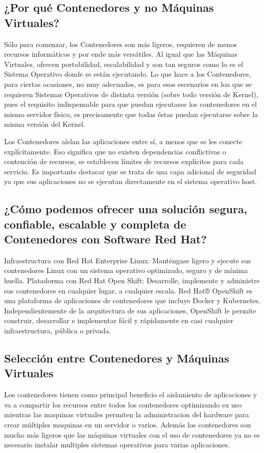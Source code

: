 \documentclass[preprint,12pt]{elsarticle}
\begin{document}
\subsection{\textbf{¿Por qué Contenedores y no Máquinas Virtuales?}}
Sólo para comenzar, los Contenedores son más ligeros, requieren de menos recursos informáticos y por ende más versátiles. Al igual que las Máquinas Virtuales, ofrecen portabilidad, escalabilidad y son tan seguros como lo es el Sistema Operativo donde se están ejecutando. Lo que hace a los Contenedores, para ciertas ocasiones, no muy adecuados, es para esos escenarios en loa que se requieren Sistemas Operativos de distinta versión (sobre todo versión de Kernel), pues el requisito indispensable para que puedan ejecutarse los contenedores en el mismo servidor físico, es precisamente que todas éstas puedan ejecutarse sobre la misma versión del Kernel.

Los Contenedores aíslan las aplicaciones entre sí, a menos que se les conecte explícitamente. Eso significa que no existen dependencias conflictivas o contención de recursos, se establecen límites de recursos explícitos para cada servicio. Es importante destacar que se trata de una capa adicional de seguridad ya que sus aplicaciones no se ejecutan directamente en el sistema operativo host.

\subsection{\textbf{¿Cómo podemos ofrecer una solución segura, confiable, escalable y completa de Contenedores con Software Red Hat?}}
Infraestructura con Red Hat Enterprise Linux: Manténgase ligero y ejecute sus contenedores Linux con un sistema operativo optimizado, seguro y de mínima huella. Platadorma con Red Hat Open Shift: Desarrolle, implemente y administre sus contenedores en cualquier lugar, a cualquier escala. Red Hat® OpenShift es una plataforma de aplicaciones de contenedores que incluye Docker y Kubernetes. Independientemente de la arquitectura de sus aplicaciones, OpenShift le permite construir, desarrollar e implementar fácil y rápidamente en casi cualquier infraestructura, pública o privada.

\subsection{\textbf{Selección entre Contenedores y Máquinas Virtuales}}
Los contenedores tienen como principal beneficio el aislamiento de aplicaciones y va a compartir los recursos entre todos los contenedores optimizando su uso mientras las maquinas virtuales permiten la administracion del hardware para crear múltiples maquinas en un servidor o varios. Además los contenedores son mucho más ligeros que las máquinas virtuales con el uso de contenedores ya no es necesario instalar multiples sistemas operativos para varias aplicaciones.
\end{document}
